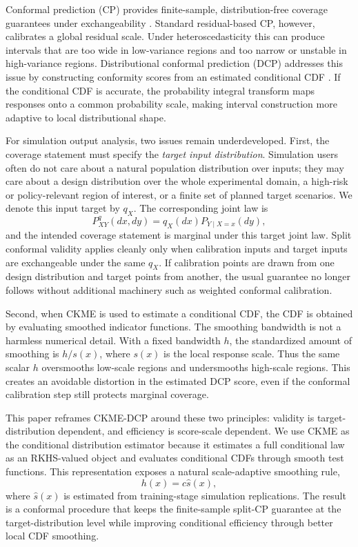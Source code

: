 \documentclass[11pt]{article}
\begin{document}
Conformal prediction (CP) provides finite-sample, distribution-free coverage guarantees under exchangeability \cite{vovk2005,shafer2008,lei2018,angelopoulos2023}. Standard residual-based CP, however, calibrates a global residual scale. Under heteroscedasticity this can produce intervals that are too wide in low-variance regions and too narrow or unstable in high-variance regions. Distributional conformal prediction (DCP) addresses this issue by constructing conformity scores from an estimated conditional CDF \cite{chernozhukov2021}. If the conditional CDF is accurate, the probability integral transform maps responses onto a common probability scale, making interval construction more adaptive to local distributional shape.

For simulation output analysis, two issues remain underdeveloped. First, the coverage statement must specify the \emph{target input distribution}. Simulation users often do not care about a natural population distribution over inputs; they may care about a design distribution over the whole experimental domain, a high-risk or policy-relevant region of interest, or a finite set of planned target scenarios. We denote this input target by \(q_X\). The corresponding joint law is
\[
  P^q_{XY}(dx,dy)=q_X(dx)P_{Y\mid X=x}(dy),
\]
and the intended coverage statement is marginal under this target joint law. Split conformal validity applies cleanly only when calibration inputs and target inputs are exchangeable under the same \(q_X\). If calibration points are drawn from one design distribution and target points from another, the usual guarantee no longer follows without additional machinery such as weighted conformal calibration.

Second, when CKME is used to estimate a conditional CDF, the CDF is obtained by evaluating smoothed indicator functions. The smoothing bandwidth is not a harmless numerical detail. With a fixed bandwidth \(h\), the standardized amount of smoothing is \(h/s(x)\), where \(s(x)\) is the local response scale. Thus the same scalar \(h\) oversmooths low-scale regions and undersmooths high-scale regions. This creates an avoidable distortion in the estimated DCP score, even if the conformal calibration step still protects marginal coverage.

This paper reframes CKME-DCP around these two principles: validity is target-distribution dependent, and efficiency is score-scale dependent. We use CKME as the conditional distribution estimator because it estimates a full conditional law as an RKHS-valued object and evaluates conditional CDFs through smooth test functions. This representation exposes a natural scale-adaptive smoothing rule,
\[
  h(x)=c\widehat s(x),
\]
where \(\widehat s(x)\) is estimated from training-stage simulation replications. The result is a conformal procedure that keeps the finite-sample split-CP guarantee at the target-distribution level while improving conditional efficiency through better local CDF smoothing.
\end{document}
